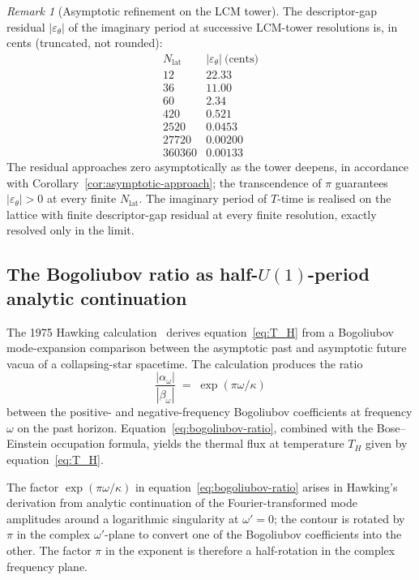 \documentclass[11pt,a4paper]{article}
\theoremstyle{definition}
\theoremstyle{remark}
\newtheorem{remark}[theorem]{Remark}
\begin{document}
\begin{remark}[Asymptotic refinement on the LCM tower]\label{rem:U1-tower-asymptote}
The descriptor-gap residual $|\varepsilon_{\theta}|$ of the imaginary period at successive LCM-tower resolutions is, in cents (truncated, not rounded):
\[
\begin{array}{r|c}
N_{\mathrm{lat}} & |\varepsilon_{\theta}|~\text{(cents)} \\ \hline
12 & 22.33 \\
36 & 11.00 \\
60 & 2.34 \\
420 & 0.521 \\
2520 & 0.0453 \\
27720 & 0.00200 \\
360360 & 0.00133
\end{array}
\]
The residual approaches zero asymptotically as the tower deepens, in accordance with Corollary~\ref{cor:asymptotic-approach}; the transcendence of $\pi$ guarantees $|\varepsilon_{\theta}| > 0$ at every finite $N_{\mathrm{lat}}$. The imaginary period of $T$-time is realised on the lattice with finite descriptor-gap residual at every finite resolution, exactly resolved only in the limit.
\end{remark}

\subsection{The Bogoliubov ratio as half-$U(1)$-period analytic continuation}\label{subsec:bogoliubov}

The 1975 Hawking calculation~\cite{Hawking1975} derives equation~\eqref{eq:T_H} from a Bogoliubov mode-expansion comparison between the asymptotic past and asymptotic future vacua of a collapsing-star spacetime. The calculation produces the ratio
\begin{equation}\label{eq:bogoliubov-ratio}
\frac{|\alpha_{\omega}|}{|\beta_{\omega}|} \;=\; \exp(\pi\omega/\kappa)
\end{equation}
between the positive- and negative-frequency Bogoliubov coefficients at frequency $\omega$ on the past horizon. Equation~\eqref{eq:bogoliubov-ratio}, combined with the Bose--Einstein occupation formula, yields the thermal flux at temperature $T_{H}$ given by equation~\eqref{eq:T_H}.

The factor $\exp(\pi\omega/\kappa)$ in equation~\eqref{eq:bogoliubov-ratio} arises in Hawking's derivation from analytic continuation of the Fourier-transformed mode amplitudes around a logarithmic singularity at $\omega'=0$; the contour is rotated by $\pi$ in the complex $\omega'$-plane to convert one of the Bogoliubov coefficients into the other. The factor $\pi$ in the exponent is therefore a half-rotation in the complex frequency plane.
\end{document}

